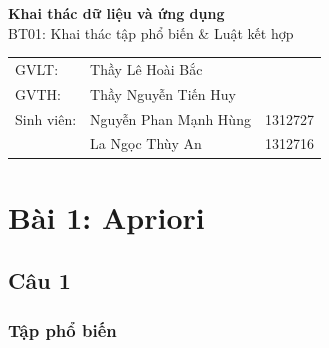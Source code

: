 \documentclass{article}
\begin{document}
	
\thispagestyle{empty}
\begin{titlepage}
\begin{center}
	\textbf{\huge{Khai thác dữ liệu và ứng dụng}}\\
	\Large{BT01: Khai thác tập phổ biến \& Luật kết hợp}	
\end{center}	

\vfill
\begin{flushright}
	\begin{tabular}{l l l}
		GVLT: & \quad Thầy Lê Hoài Bắc\\
		GVTH: & \quad Thầy Nguyễn Tiến Huy\\
		Sinh viên: & \quad Nguyễn Phan Mạnh Hùng & 1312727\\
		& \quad La Ngọc Thùy An & 1312716\\
	\end{tabular}
\end{flushright}
\end{titlepage}
\pagebreak
\thispagestyle{empty}
\tableofcontents
\pagebreak 
\section{Bài 1: Apriori}\label{sec: prob1}
\subsection{Câu 1}
\subsubsection{Tập phổ biến}
\end{document}
